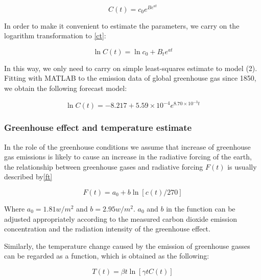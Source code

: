 \documentclass[12pt]{article}  %
\begin{document}
\begin{equation}\label{ct}
    C\left( t \right) =c_0e^{Be^{at}}
\end{equation}







In order to make it convenient to estimate the parameters, we carry on the logarithm transformation to \eqref{ct}:



\begin{equation}
    \ln C\left( t \right) =\ln c_0+B_te^{at}
\end{equation}


In this way, we only need to carry on simple least-squares estimate to model (2). Fitting with MATLAB to the emission data of global greenhouse gas since 1850, we obtain the following forecast model:

\begin{equation}
    \ln C(t)=-8.217+5.59\times 10^{-4}e^{8.70\times 10^{-3}t}\label{lnct}
\end{equation}



\subsubsection{Greenhouse effect and temperature estimate}
In the role of the greenhouse conditions we assume that increase of greenhouse gas emissions is likely to cause an increase in the radiative forcing of the earth, the relationship between greenhouse gases and radiative forcing $F(t)$ is usually described by\eqref{ft}


\begin{equation}\label{ft}
    F\left( t \right) =a_0+b\ln \left[ c\left( t \right) /270 \right] 
\end{equation}


Where $a_0=1.81w/m^2$ and $b=2.95w/m^2$. $a_0$ and $b$ in the function can be adjusted appropriately according to the measured carbon dioxide emission concentration and the radiation intensity of the greenhouse effect.


Similarly, the temperature change caused by the emission of greenhouse gasses can be regarded as a function, which is obtained as the following:



\begin{equation}
    T\left( t \right) =\beta t\ln \left[ \gamma tC\left( t \right)\right]
\end{equation}
\end{document}
